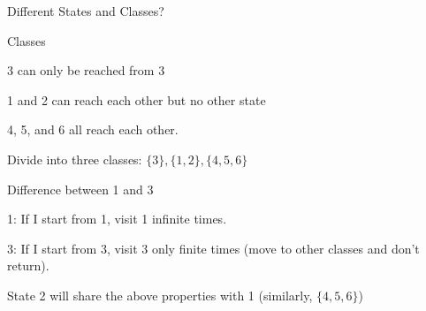 \begin{frame}{Different States and Classes?}

{
\small
\plitemsep 0.05in
\bci
\item Classes
\bci
\item<2-> 3 can only be reached from 3
\item<3-> 1 and 2 can reach each other but no other state
\item<4-> 4, 5, and 6 all reach each other.
\item<5-> Divide into three classes: $\{ 3\}, \{1,2 \}, \{4,5,6 \}$
\item<6->  
\eci
\eci
}
{
\vspace{-0.5cm}
\begin{center}
\end{center}
}

\small
\plitemsep 0.05in
\bci
\item<7-> Difference between 1 and 3
\bci
\item<8-> 1: If I start from 1, visit 1 infinite times.
\item<9-> 3: If I start from 3, visit 3 only finite times (move to other classes and don't return). 
\item<10->  
\eci

\item<11-> State 2 will share the above properties with 1 (similarly,
  $\{ 4,5, 6\}$)
\item<12->  
\eci
\end{frame}

